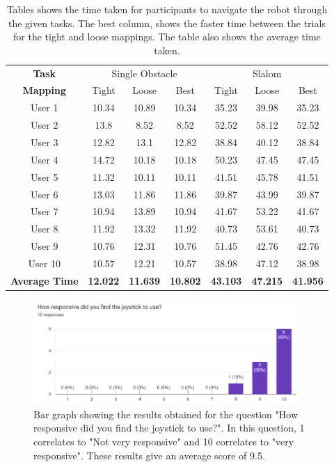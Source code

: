 \documentclass{l4proj}
\begin{document}
\begin{appendices}
\begin{table}[!ht]
\centering
\caption{Tables shows the time taken for participants to navigate the robot through the given tasks. The best column, shows the faster time between the trials for the tight and loose mappings. The table also shows the average time taken.}
\label{tab:joystick-times}
\begin{tabular}{ccccccc}
\textbf{Task} & \multicolumn{3}{c}{Single Obstacle} & \multicolumn{3}{c}{Slalom} \\
\textbf{Mapping} & Tight & Loose & Best & Tight & Loose & Best \\
User 1 & 10.34 & 10.89 & 10.34 & 35.23 & 39.98 & 35.23 \\
User 2 & 13.8 & 8.52 & 8.52 & 52.52 & 58.12 & 52.52 \\
User 3 & 12.82 & 13.1 & 12.82 & 38.84 & 40.12 & 38.84 \\
User 4 & 14.72 & 10.18 & 10.18 & 50.23 & 47.45 & 47.45 \\
User 5 & 11.32 & 10.11 & 10.11 & 41.51 & 45.78 & 41.51 \\
User 6 & 13.03 & 11.86 & 11.86 & 39.87 & 43.99 & 39.87 \\
User 7 & 10.94 & 13.89 & 10.94 & 41.67 & 53.22 & 41.67 \\
User 8 & 11.92 & 13.32 & 11.92 & 40.73 & 53.61 & 40.73 \\
User 9 & 10.76 & 12.31 & 10.76 & 51.45 & 42.76 & 42.76 \\
User 10 & 10.57 & 12.21 & 10.57 & 38.98 & 47.12 & 38.98 \\
\textbf{Average Time} & \textbf{12.022} & \textbf{11.639} & \textbf{10.802} & \textbf{43.103} & \textbf{47.215} & \textbf{41.956}
\end{tabular}
\end{table}

\begin{figure}
    \centering
    \includegraphics[width=0.9\textwidth]{images/responsive-joystick-results.png}
    \caption{Bar graph showing the results obtained for the question "How responsive did you find the joystick to use?". In this question, 1 correlates to "Not very responsive" and 10 correlates to "very responsive". These results give an average score of 9.5.}
    \label{fig:joystick-responsive-results}
\end{figure}


\end{appendices}
\end{document}
